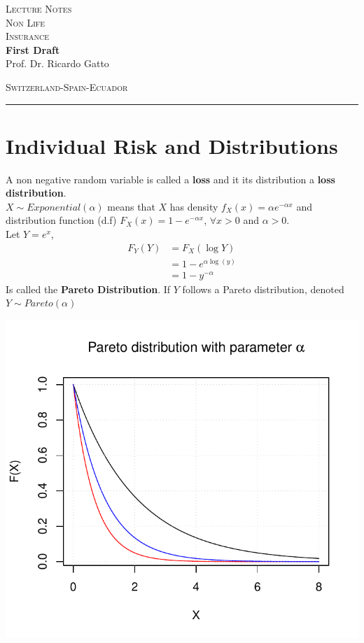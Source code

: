 \documentclass[11pt,a4paper,oneside]{article}\usepackage[]{graphicx}\usepackage[]{color}
\makeatletter
\def\maxwidth{ %
  \ifdim\Gin@nat@width>\linewidth
    \linewidth
  \else
    \Gin@nat@width
  \fi
}
\newenvironment{knitrout}{}{} %
\newcommand*{\titleBOOK}{\begingroup
\centering
\vspace*{\baselineskip}
\vspace*{\baselineskip}
{\Huge\scshape Lecture Notes}\\[10mm]
{\Huge\scshape Non Life  \\[5mm]
Insurance} \\ [\baselineskip]
{\Large\bfseries First Draft}\\[0.3 \textheight]
{\Large Prof. Dr. Ricardo Gatto}\\
\vfill
\begin{center}
{\scshape Switzerland-Spain-Ecuador}\\
\rule{\textwidth}{0.5pt}
\end{center}
\vspace*{\baselineskip}
\endgroup}
\makeatother
\begin{document}
\titleBOOK
\newpage

\tableofcontents
\newpage


\section{Individual Risk and Distributions}
A non negative random variable is called a \textbf{loss} and it its distribution a \textbf{loss distribution}.\\
$X\sim Exponential(\alpha)$ means that $X$ has density $f_X(x)=\alpha e^{-\alpha x}$ and distribution function (d.f) $F_X(x)=1-e^{-\alpha x}$, $\forall x>0$ and $\alpha>0$.\\


Let $Y=e^x$, 
\begin{align*}
F_Y(Y) &= F_X(\log Y)\\
&=1-e^{\alpha \log (y)}\\
&=1-y^{-\alpha}
\end{align*}
Is called the \textbf{Pareto Distribution}. If $Y$ follows a Pareto distribution, denoted  $Y\sim Pareto(\alpha)$

\begin{knitrout}
\color{fgcolor}

{\centering \includegraphics[width=\maxwidth]{figure/unnamed-chunk-1-1} 

}



\end{knitrout}
\end{document}
